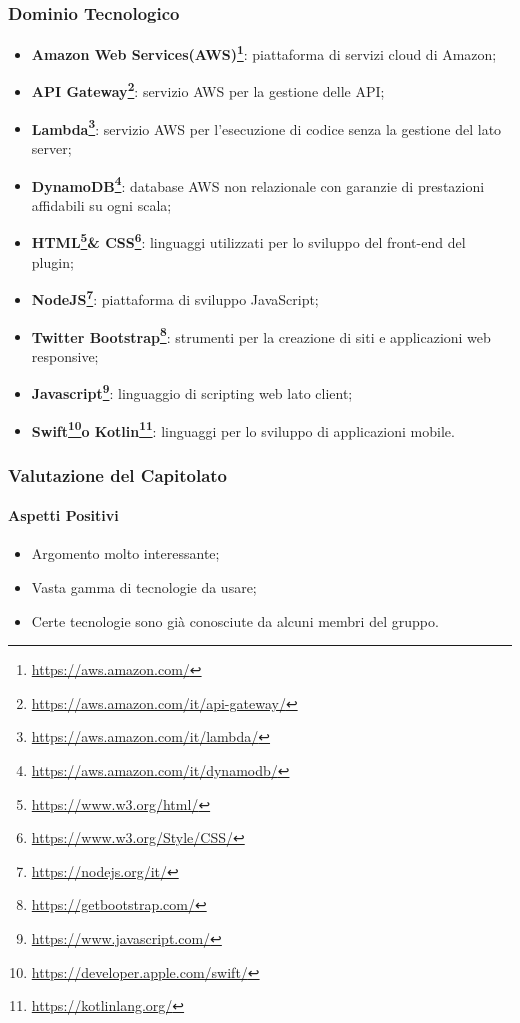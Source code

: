 \subsubsection{Dominio Tecnologico}
\begin{itemize}
	\item \textbf{Amazon Web Services(AWS)\footnote{\hyperref[Link al sito]{https://aws.amazon.com/}}\glossario}: piattaforma di servizi cloud di Amazon;
	\item \textbf{API Gateway\footnote{\hyperref[Link al sito]{https://aws.amazon.com/it/api-gateway/}}\glossario}: servizio AWS per la gestione delle API;
	\item \textbf{Lambda\footnote{\hyperref[Link al sito]{https://aws.amazon.com/it/lambda/}}\glossario}: servizio AWS per l’esecuzione di codice senza la gestione del lato server;
	\item \textbf{DynamoDB\footnote{\hyperref[Link al sito]{https://aws.amazon.com/it/dynamodb/}}\glossario}: database AWS non relazionale con garanzie di prestazioni affidabili su ogni scala;
	\item \textbf{HTML\footnote{\hyperref[Link al sito]{https://www.w3.org/html/}}\glossario \& CSS\footnote{\hyperref[Link al sito]{https://www.w3.org/Style/CSS/}}\glossario}: linguaggi utilizzati per lo sviluppo del front-end del plugin;
	\item \textbf{NodeJS\footnote{\hyperref[Link al sito]{https://nodejs.org/it/}}\glossario}: piattaforma di sviluppo JavaScript;
	\item \textbf{Twitter Bootstrap\footnote{\hyperref[Link al sito]{https://getbootstrap.com/}}\glossario}: strumenti per la creazione di siti e applicazioni web responsive;
	\item \textbf{Javascript\footnote{\hyperref[Link al sito]{https://www.javascript.com/}}}: linguaggio di scripting web lato client;
	\item \textbf{Swift\footnote{\hyperref[Link al sito]{https://developer.apple.com/swift/}}\glossario o Kotlin\footnote{\hyperref[Link al sito]{https://kotlinlang.org/}}\glossario}: linguaggi per lo sviluppo di applicazioni mobile.
\end{itemize}

\subsubsection{Valutazione del Capitolato}
\paragraph{Aspetti Positivi}
\begin{itemize}
	\item Argomento molto interessante;
	\item Vasta gamma di tecnologie da usare;
	\item Certe tecnologie sono già conosciute da alcuni membri del gruppo.
\end{itemize}


